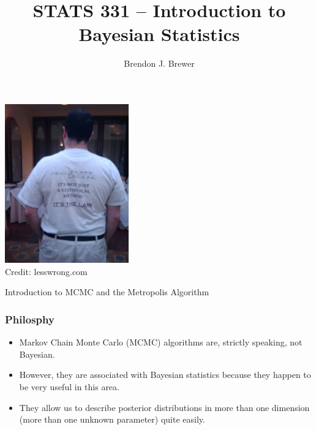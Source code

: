 \documentclass{beamer}
\author{Brendon J. Brewer}
\title{STATS 331 -- Introduction to Bayesian Statistics}
\institute{The University of Auckland}
\date{}
\begin{document}
\frame{\titlepage}

\begin{frame}
\begin{center}
\includegraphics[width=0.4\textwidth]{images/tshirt.png} \\
Credit: lesswrong.com
\end{center}

\end{frame}

\begin{frame}
\begin{center}
\Large
Introduction to MCMC and the Metropolis Algorithm
\end{center}

\end{frame}

\begin{frame}
\frametitle{Philosphy}
\begin{itemize}
\item Markov Chain Monte Carlo (MCMC) algorithms are, strictly speaking, not
Bayesian.\pause
\item However, they are associated with Bayesian statistics because they happen
to be very useful in this area.\pause
\item They allow us to describe posterior distributions in more than one
dimension (more than one unknown parameter) quite easily.
\end{itemize}
\end{frame}
\end{document}
